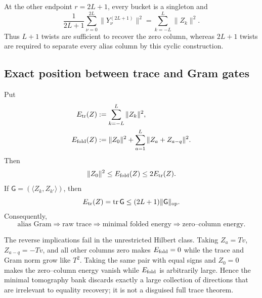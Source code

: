 At the other endpoint \(r=2L+1\), every bucket is a singleton and
\begin{equation}
 \frac1{2L+1}\sum_{\nu=0}^{2L}\|Y_\nu^{(2L+1)}\|^2
 =\sum_{k=-L}^{L}\|Z_k\|^2.
 \label{eq:tpc39-full-DFT-Parseval}
\end{equation}
Thus \(L+1\) twists are sufficient to recover the zero column, whereas
\(2L+1\) twists are required to separate every alias column by this
cyclic construction.

\subsection{Exact position between trace and Gram gates}

Put
\begin{align}
 E_{\rm tr}(Z)
 &:=\sum_{k=-L}^{L}\|Z_k\|^2,
 \label{eq:tpc39-trace-energy}\\
 E_{\rm fold}(Z)
 &:=\|Z_0\|^2+
 \sum_{a=1}^{L}\|Z_a+Z_{a-q}\|^2.
 \label{eq:tpc39-fold-energy}
\end{align}
Then
\begin{equation}
 \|Z_0\|^2\le E_{\rm fold}(Z)\le2E_{\rm tr}(Z).
 \label{eq:tpc39-fold-trace-comparison}
\end{equation}
If \(\mathsf G=(\langle Z_k,Z_{k'}\rangle)\), then
\begin{equation}
 E_{\rm tr}(Z)=\operatorname{tr}\mathsf G
 \le(2L+1)\|\mathsf G\|_{\operatorname{op}}.
 \label{eq:tpc39-Gram-trace-comparison}
\end{equation}
Consequently,
\begin{equation}
 \text{alias Gram}
 \Longrightarrow
 \text{raw trace}
 \Longrightarrow
 \text{minimal folded energy}
 \Longrightarrow
 \text{zero--column energy}.
 \label{eq:tpc39-gate-hierarchy}
\end{equation}

The reverse implications fail in the unrestricted Hilbert class.  Taking
\(Z_a=Tv\), \(Z_{a-q}=-Tv\), and all other columns zero makes
\(E_{\rm fold}=0\) while the trace and Gram norm grow like \(T^2\).
Taking the same pair with equal signs and \(Z_0=0\) makes the zero--column
energy vanish while \(E_{\rm fold}\) is arbitrarily large.  Hence the
minimal tomography bank discards exactly a large collection of directions
that are irrelevant to equality recovery; it is not a disguised full
trace theorem.
